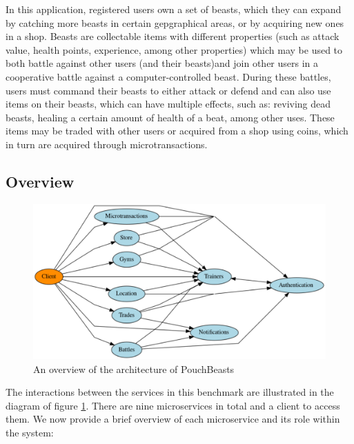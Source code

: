 In this application, registered users own a set of beasts, which they can expand by catching more beasts in certain gepgraphical areas, or by acquiring new ones in a shop. Beasts are collectable items with different properties (such as attack value, health points, experience, among other properties) which may be used to both battle against other users (and their beasts)and join other users in a cooperative battle against a computer-controlled beast. During these battles, users must command their beasts to either attack or defend and can also use items on their beasts, which can have multiple effects, such as: reviving dead beasts, healing a certain amount of health of a beat, among other uses. These items may be traded with other users or acquired from a shop using coins, which in turn are acquired through microtransactions.

\subsection{Overview}

\begin{figure}[htbp]
    \centering
    \includegraphics[width=\textwidth]{Chapters/benchmark/figures/interaction-diagram.pdf}
    \caption{An overview of the architecture of PouchBeasts}
    \label{fig:pouchbeasts-overview}
\end{figure}

The interactions between the services in this benchmark are illustrated in the diagram of figure \ref{fig:pouchbeasts-overview}. There are nine microservices in total and a client to access them. We now provide a brief overview of each microservice and its role within the system:

